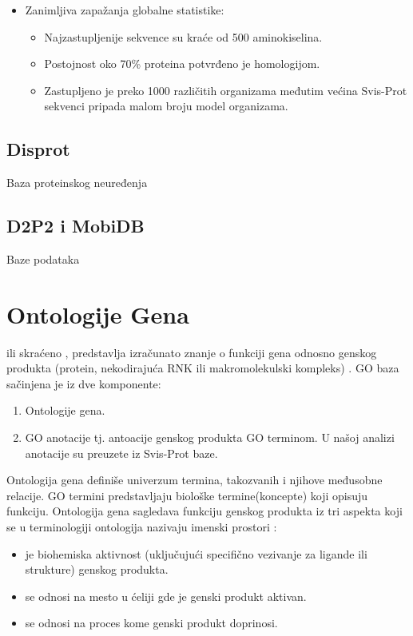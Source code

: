 \begin{itemize}
  \item Zanimljiva zapažanja globalne statistike:
    \begin{itemize}
      \item Najzastupljenije sekvence su kraće od 500 aminokiselina.
      \item Postojnost oko 70\% proteina potvrđeno je homologijom.
      \item Zastupljeno je preko 1000 različitih organizama međutim
        većina Svis-Prot sekvenci pripada malom broju model organizama.
    \end{itemize}
      

\end{itemize}


\subsection{Disprot}

Baza proteinskog neuređenja 

\subsection{D2P2 i MobiDB}

Baze podataka


\section{Ontologije Gena}


  ili skraćeno , 
predstavlja izračunato znanje o funkciji gena odnosno genskog
produkta (protein, nekodirajuća RNK ili makromolekulski kompleks)
\parencite{GO2016}.
GO baza sačinjena je iz dve komponente:
\begin{enumerate}
  \item Ontologije gena.
  \item GO anotacije tj. antoacije genskog produkta GO terminom. U našoj
    analizi anotacije su preuzete iz Svis-Prot baze.
\end{enumerate}

Ontologija gena definiše univerzum termina, takozvanih 
 i njihove međusobne relacije. GO termini predstavljaju biološke
termine(koncepte) koji opisuju funkciju. Ontologija gena sagledava funkciju
genskog produkta iz tri aspekta koji se u terminologiji ontologija nazivaju
imenski prostori :
\begin{itemize}
  \item {} je biohemiska aktivnost (uključujući
    specifično vezivanje za ligande ili strukture) genskog produkta.
  \item {} se odnosi na mesto u ćeliji gde je
    genski produkt aktivan.
  \item {} se odnosi na proces kome genski produkt
    doprinosi.
\end{itemize}

